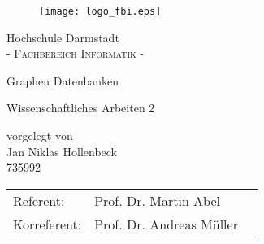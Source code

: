 \pagestyle{empty} %
\begin{figure}[t]
	\centering
	\texttt{[image: logo\_fbi.eps]}
\end{figure}


\begin{center}
\Large Hochschule Darmstadt \\
\normalsize \textsc{- Fachbereich Informatik -} \\

\vspace{105 pt}

\Huge Graphen Datenbanken \\ 
\normalsize
\vspace{20 pt}

Wissenschaftliches Arbeiten 2\\ 


\vspace{75 pt}


vorgelegt von \\
\vspace{5 pt}
Jan Niklas Hollenbeck \\
735992
\vspace{115 pt}

\begin{tabular}[h]{p{4cm}l l}
	Referent: & Prof. Dr. Martin Abel\\
	Korreferent: & Prof. Dr. Andreas M\"uller
\end{tabular}


\end{center}
